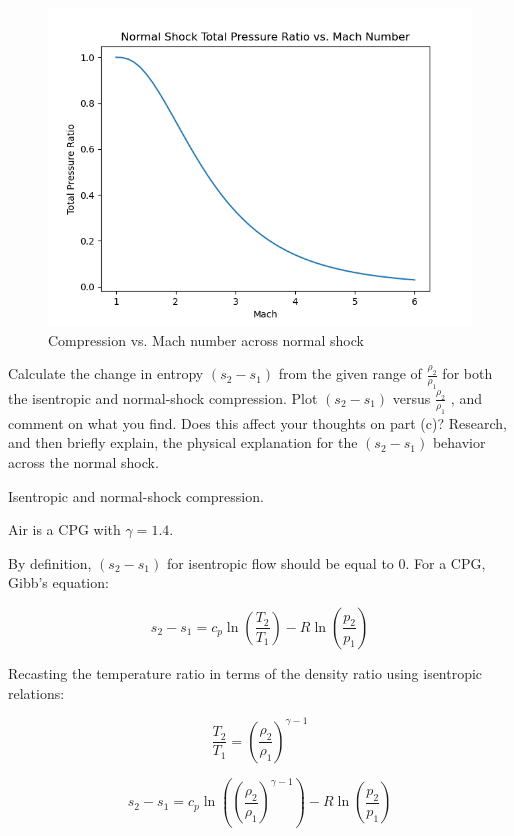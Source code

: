 \documentclass[../main.tex]{subfiles}
\begin{document}
\begin{figure}[h!]
    \centering
    \includegraphics{../../images/problem_1/compression_efficiency_NS.png}
    \caption{Compression vs. Mach number across normal shock}
    \label{efficiency}
\end{figure}

\newpage


Calculate the change in entropy \((s_2 - s_1)\) from the given range of \(\frac{\rho_2}{\rho_1}\) for both the isentropic and normal-shock compression. 
Plot \((s_2 - s_1)\) versus \(\frac{\rho_2}{\rho_1}\) , and comment on what you find.
Does this affect your thoughts on part (c)? 
Research, and then briefly explain, the physical explanation for the \((s_2 - s_1)\) behavior across the normal shock.

\givens{}
Isentropic and normal-shock compression.

\assumptions{}
Air is a CPG with \(\gamma=1.4\).

\solution{}

By definition, \((s_2 - s_1)\) for isentropic flow should be equal to 0.
For a CPG, Gibb's equation:

\[
    s_2 - s_1 = c_p \ln{\left({\frac{T_2}{T_1}}\right)} - R \ln{\left({\frac{p_2}{p_1}}\right)}
\]

Recasting the temperature ratio in terms of the density ratio using isentropic relations:

\[
    \frac{T_2}{T_1} = \left({\frac{\rho_2}{\rho_1}}\right)^{\gamma-1}
\]

\[
    s_2 - s_1 = c_p \ln{\left({\left({\frac{\rho_2}{\rho_1}}\right)^{\gamma-1}}\right)} - R \ln{\left({\frac{p_2}{p_1}}\right)}
\]
\end{document}
